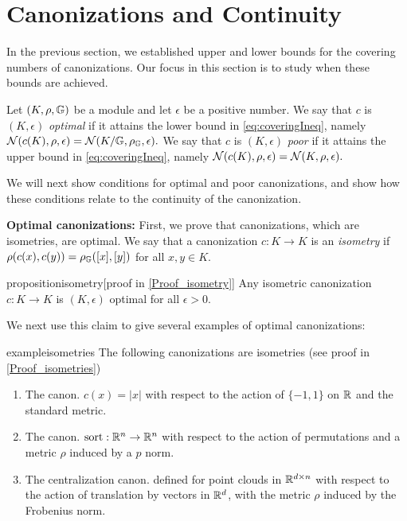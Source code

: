 \documentclass{article}
\begin{document}
\section{Canonizations and Continuity}\label{sec:evaluation}
In the previous section, we established upper and lower bounds for the covering numbers of canonizations. Our focus in this section is to study when these bounds are achieved.
\begin{definition}
Let $(K,\rho,\mathbb{G})$ be a module and let $\epsilon$ be a positive number. We say that $c$ is $(K,\epsilon) $ \emph{optimal} if it attains the lower bound in \eqref{eq:coveringIneq}, namely 
$
\mathcal{N}(c(K),\rho,\epsilon) = \mathcal{N}(K/\mathbb{G},\rho_{\mathbb{G}},\epsilon).
$
We say that $c$ is $(K,\epsilon) $ \emph{poor}  if it attains the upper bound in \eqref{eq:coveringIneq}, namely 
$
\mathcal{N}(c(K),\rho,\epsilon)=\mathcal{N}(K,\rho,\epsilon).
$
\end{definition}
We will next show conditions for optimal and poor canonizations, and show how these conditions relate to the continuity of the canonization. 

\textbf{Optimal canonizations:}
First, we prove that canonizations, which are isometries, are optimal. We say that a canonization $c:K\to K $ is an \emph{isometry} if $\rho(c(x),c(y))=\rho_{\mathbb{G}}([x],[y])  $ for all $x,y\in K$.
\begin{restatable}{proposition}{isometry}\label{prop:isometry}[proof in \ref{Proof_isometry}]
    Any isometric canonization $c:K\to K$ is $(K,\epsilon) $ optimal for all $\epsilon>0$.
\end{restatable}

We next use this claim to give several examples of  optimal canonizations:
\begin{restatable}{example}{isometries}\label{prop:isometries}
    The following canonizations are isometries (see proof in \ref{Proof_isometries})
\begin{enumerate}
\item The canon. $c(x)=|x|$ with respect to the action of $\{-1,1\} $ on $\mathbb{R}$ and the standard metric.
\item The canon. $\mathrm{sort}:\mathbb{R}^n \to \mathbb{R}^n $ with respect to the action of permutations and a metric $\rho$ induced by a $p$ norm.
\item The centralization canon. defined for point clouds in $\mathbb{R}^{d\times n}$ with respect to the action of translation by vectors in $\mathbb{R}^d$, with the metric $\rho$ induced by the Frobenius norm.
\end{enumerate}
\end{restatable}
\end{document}
